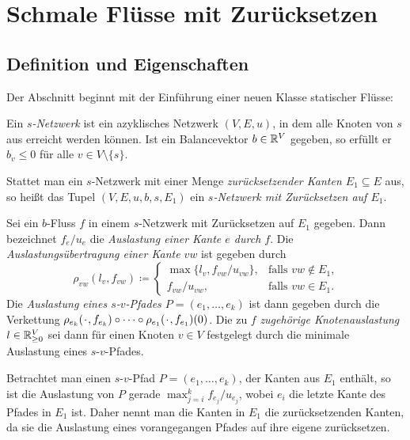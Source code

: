 \chapter{Schmale Flüsse mit Zurücksetzen}\label{chapter-thin-flows}
\newcommand*{\PlH}{\makebox[1ex]{\textbf{$\cdot$}}}

\section{Definition und Eigenschaften}

Der Abschnitt beginnt mit der Einführung einer neuen Klasse statischer Flüsse:

\begin{definition}
	Ein \emph{$s$-Netzwerk} ist ein azyklisches Netzwerk $(V, E, u)$, in dem alle Knoten von $s$ aus erreicht werden können.
	Ist ein Balancevektor $b\in\mathbb{R}^V$ gegeben, so erfüllt er $b_v\leq 0$ für alle $v\in V\setminus \{ s \}$.
	
 Stattet man ein $s$-Netzwerk mit einer Menge \emph{zurücksetzender Kanten $E_1\subseteq E$} aus, so heißt das Tupel $(V, E, u, b, s, E_1)$ ein \emph{$s$-Netzwerk mit Zurücksetzen auf $E_1$}.
\end{definition}


\begin{definition}[Auslastung]
	Sei ein $b$-Fluss $f$ in einem $s$-Netzwerk mit Zurück\-setzen auf $E_1$ gegeben.
	Dann bezeichnet $f_e/u_e$ die \emph{Auslastung einer Kante $e$ durch $f$}.
	Die \emph{Auslastungsübertragung einer Kante $vw$} ist gegeben durch \[ \rho_{vw}(l_v, f_{vw}) \coloneq \begin{cases}
		\max\{ l_v, f_{vw} / u_{vw} \}, & \text{falls $vw\notin E_1$,}\\
		f_{vw} / u_{vw}, & \text{falls $vw\in E_1$.}
	\end{cases}
	\]
	Die \emph{Auslastung eines $s$-$v$-Pfades $P=(e_1,\dots,e_k)$} ist dann gegeben durch die Verkettung $\rho_{e_k}(\PlH, f_{e_k})\circ \dots \circ \rho_{e_1}(\PlH, f_{e_1})(0)$.
	Die zu $f$ \emph{zugehörige Knotenauslastung $l\in\mathbb{R}_{\geq 0}^V$} sei dann für einen Knoten $v\in V$ festgelegt durch die minimale Auslastung eines $s$-$v$-Pfades.
\end{definition}

Betrachtet man einen $s$-$v$-Pfad $P=(e_1, \dots, e_k)$, der Kanten aus $E_1$ enthält, so ist die Auslastung von $P$ gerade $\max_{j=i}^k f_{e_j}/u_{e_j}$, wobei $e_i$ die letzte Kante des Pfades in $E_1$ ist.
Daher nennt man die Kanten in $E_1$ die zurücksetzenden Kanten, da sie die Auslastung eines vorangegangen Pfades auf ihre eigene zurücksetzen.

